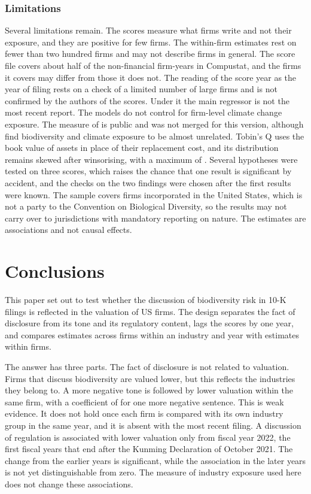 \documentclass[12pt,a4paper]{article}
\begin{document}
\subsubsection{Limitations}

Several limitations remain. The scores measure what firms write and not their exposure, and they are positive for few firms. The within-firm estimates rest on fewer than two hundred firms and may not describe firms in general. The score file covers about half of the non-financial firm-years in Compustat, and the firms it covers may differ from those it does not. The reading of the score year as the year of filing rests on a check of a limited number of large firms and is not confirmed by the authors of the scores. Under it the main regressor is not the most recent report. The models do not control for firm-level climate change exposure. The measure of \citet{sautner2023} is public and was not merged for this version, although \citet{giglio2026} find biodiversity and climate exposure to be almost unrelated. Tobin's Q uses the book value of assets in place of their replacement cost, and its distribution remains skewed after winsorising, with a maximum of \maxQ{}. Several hypotheses were tested on three scores, which raises the chance that one result is significant by accident, and the checks on the two findings were chosen after the first results were known. The sample covers firms incorporated in the United States, which is not a party to the Convention on Biological Diversity, so the results may not carry over to jurisdictions with mandatory reporting on nature. The estimates are associations and not causal effects.

\section{Conclusions}

This paper set out to test whether the discussion of biodiversity risk in 10-K filings is reflected in the valuation of US firms. The design separates the fact of disclosure from its tone and its regulatory content, lags the scores by one year, and compares estimates across firms within an industry and year with estimates within firms.

The answer has three parts. The fact of disclosure is not related to valuation. Firms that discuss biodiversity are valued lower, but this reflects the industries they belong to. A more negative tone is followed by lower valuation within the same firm, with a coefficient of \coefFAllNeg{} for one more negative sentence. This is weak evidence. It does not hold once each firm is compared with its own industry group in the same year, and it is absent with the most recent filing. A discussion of regulation is associated with lower valuation only from fiscal year 2022, the first fiscal years that end after the Kunming Declaration of October 2021. The change from the earlier years is significant, while the association in the later years is not yet distinguishable from zero. The measure of industry exposure used here does not change these associations.
\end{document}
